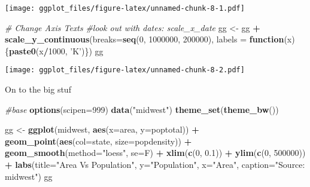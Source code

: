 \documentclass[]{article}
\newenvironment{Shaded}{\begin{snugshade}}{\end{snugshade}}
\newcommand{\KeywordTok}[1]{\textcolor[rgb]{0.13,0.29,0.53}{\textbf{#1}}}
\newcommand{\DataTypeTok}[1]{\textcolor[rgb]{0.13,0.29,0.53}{#1}}
\newcommand{\DecValTok}[1]{\textcolor[rgb]{0.00,0.00,0.81}{#1}}
\newcommand{\FloatTok}[1]{\textcolor[rgb]{0.00,0.00,0.81}{#1}}
\newcommand{\StringTok}[1]{\textcolor[rgb]{0.31,0.60,0.02}{#1}}
\newcommand{\CommentTok}[1]{\textcolor[rgb]{0.56,0.35,0.01}{\textit{#1}}}
\newcommand{\ControlFlowTok}[1]{\textcolor[rgb]{0.13,0.29,0.53}{\textbf{#1}}}
\newcommand{\OperatorTok}[1]{\textcolor[rgb]{0.81,0.36,0.00}{\textbf{#1}}}
\newcommand{\NormalTok}[1]{#1}
\begin{document}
\texttt{[image: ggplot\_files/figure-latex/unnamed-chunk-8-1.pdf]}

\begin{Shaded}
\begin{Highlighting}[]
\CommentTok{# Change Axis Texts}
\CommentTok{#look out with dates: scale_x_date}
\NormalTok{gg <-}\StringTok{ }\NormalTok{gg }\OperatorTok{+}\StringTok{ }\KeywordTok{scale_y_continuous}\NormalTok{(}\DataTypeTok{breaks=}\KeywordTok{seq}\NormalTok{(}\DecValTok{0}\NormalTok{, }\DecValTok{1000000}\NormalTok{, }\DecValTok{200000}\NormalTok{), }\DataTypeTok{labels =} \ControlFlowTok{function}\NormalTok{(x)\{}\KeywordTok{paste0}\NormalTok{(x}\OperatorTok{/}\DecValTok{1000}\NormalTok{, }\StringTok{'K'}\NormalTok{)\})}
\NormalTok{gg}
\end{Highlighting}
\end{Shaded}

\texttt{[image: ggplot\_files/figure-latex/unnamed-chunk-8-2.pdf]}

On to the big stuf

\begin{Shaded}
\begin{Highlighting}[]
\CommentTok{#base}
\KeywordTok{options}\NormalTok{(}\DataTypeTok{scipen=}\DecValTok{999}\NormalTok{)}
\KeywordTok{data}\NormalTok{(}\StringTok{"midwest"}\NormalTok{)}
\KeywordTok{theme_set}\NormalTok{(}\KeywordTok{theme_bw}\NormalTok{())}

\NormalTok{gg <-}\StringTok{ }\KeywordTok{ggplot}\NormalTok{(midwest, }\KeywordTok{aes}\NormalTok{(}\DataTypeTok{x=}\NormalTok{area, }\DataTypeTok{y=}\NormalTok{poptotal)) }\OperatorTok{+}\StringTok{ }
\StringTok{  }\KeywordTok{geom_point}\NormalTok{(}\KeywordTok{aes}\NormalTok{(}\DataTypeTok{col=}\NormalTok{state, }\DataTypeTok{size=}\NormalTok{popdensity)) }\OperatorTok{+}\StringTok{ }
\StringTok{  }\KeywordTok{geom_smooth}\NormalTok{(}\DataTypeTok{method=}\StringTok{"loess"}\NormalTok{, }\DataTypeTok{se=}\NormalTok{F) }\OperatorTok{+}\StringTok{ }\KeywordTok{xlim}\NormalTok{(}\KeywordTok{c}\NormalTok{(}\DecValTok{0}\NormalTok{, }\FloatTok{0.1}\NormalTok{)) }\OperatorTok{+}\StringTok{ }\KeywordTok{ylim}\NormalTok{(}\KeywordTok{c}\NormalTok{(}\DecValTok{0}\NormalTok{, }\DecValTok{500000}\NormalTok{)) }\OperatorTok{+}\StringTok{ }
\StringTok{  }\KeywordTok{labs}\NormalTok{(}\DataTypeTok{title=}\StringTok{"Area Vs Population"}\NormalTok{, }\DataTypeTok{y=}\StringTok{"Population"}\NormalTok{, }\DataTypeTok{x=}\StringTok{"Area"}\NormalTok{, }\DataTypeTok{caption=}\StringTok{"Source: midwest"}\NormalTok{)}
\NormalTok{gg}
\end{Highlighting}
\end{Shaded}
\end{document}
